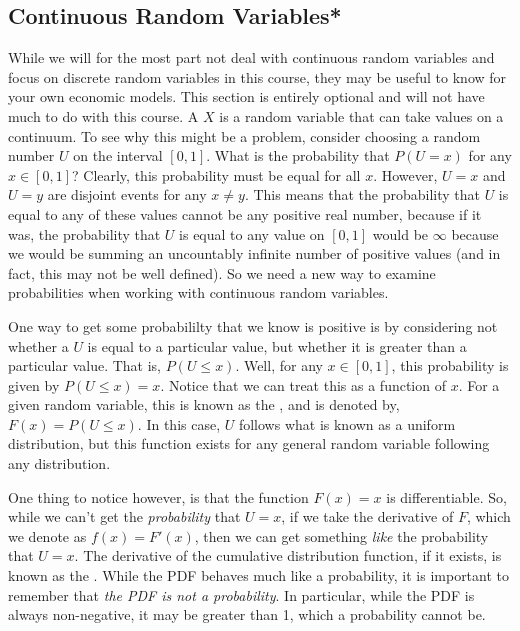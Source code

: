 \subsection*{Continuous Random Variables*}
While we will for the most part not deal with continuous random variables and focus on discrete random variables in this course, they may be useful to know for your own economic models. This section is entirely optional and will not have much to do with this course. A  $X$ is a random variable that can take values on a continuum. To see why this might be a problem, consider choosing a random number $U$ on the interval $[0, 1]$. What is the probability that $P(U = x)$ for any $x \in [0, 1]$? Clearly, this probability must be equal for all $x$. However, $U = x$ and $U = y$ are disjoint events for any $x \neq y$. This means that the probability that $U$ is equal to any of these values cannot be any positive real number, because if it was, the probability that $U$ is equal to any value on $[0, 1]$ would be $\infty$ because we would be summing an uncountably infinite number of positive values (and in fact, this may not be well defined). So we need a new way to examine probabilities when working with continuous random variables.

One way to get some probabililty that we know is positive is by considering not whether a $U$ is equal to a particular value, but whether it is greater than a particular value. That is, $P(U \leq x)$. Well, for any $x \in [0, 1]$, this probability is given by $P(U \leq x) = x$. Notice that we can treat this as a function of $x$. For a given random variable, this is known as the , and is denoted by, $F(x) = P(U \leq x)$. In this case, $U$ follows what is known as a uniform distribution, but this function exists for any general random variable following any distribution. 

One thing to notice however, is that the function $F(x) = x$ is differentiable. So, while we can't get the \emph{probability} that $U = x$, if we take the derivative of $F$, which we denote as $f(x) = F'(x)$, then we can get something \emph{like} the probability that $U = x$. The derivative of the cumulative distribution function, if it exists, is known as the . While the PDF behaves much like a probability, it is important to remember that \emph{the PDF is not a probability}. In particular, while the PDF is always non-negative, it may be greater than 1, which a probability cannot be. 


